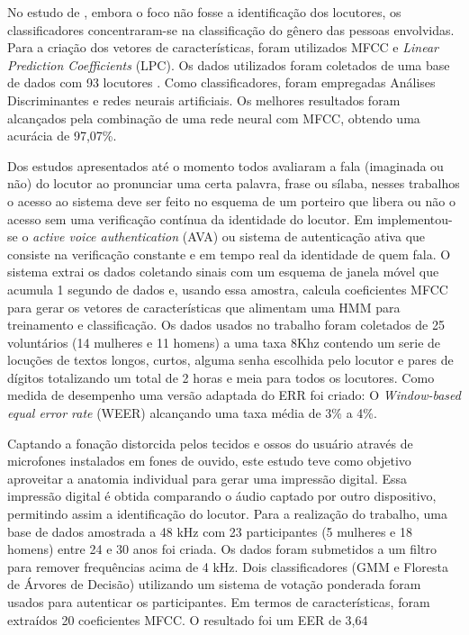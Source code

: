 			\par No estudo de \cite{ali2022speech}, embora o foco não fosse a identificação dos locutores, os classificadores concentraram-se na classificação do gênero das pessoas envolvidas. Para a criação dos vetores de características, foram utilizados MFCC e \textit{Linear Prediction Coefficients} (LPC). Os dados utilizados foram coletados de uma base de dados com 93 locutores \cite{10.1121/1.411872}. Como classificadores, foram empregadas Análises Discriminantes e redes neurais artificiais. Os melhores resultados foram alcançados pela combinação de uma rede neural com MFCC, obtendo uma acurácia de 97,07\%.
			

			\par Dos estudos apresentados até o momento todos avaliaram a fala (imaginada ou não) do locutor ao pronunciar uma certa palavra, frase ou sílaba, nesses trabalhos o acesso ao sistema deve ser feito no esquema de um porteiro que libera ou não o acesso sem uma verificação contínua da identidade do locutor. Em \cite{WOS:000525844000004} implementou-se o \textit{active voice authentication} (AVA) ou sistema de autenticação ativa que consiste na verificação constante e em tempo real da identidade de quem fala. O sistema extrai os dados coletando sinais com um esquema de janela móvel que acumula 1 segundo de dados e, usando essa amostra, calcula coeficientes MFCC para gerar os vetores de características que alimentam uma HMM para treinamento e classificação. Os dados usados no trabalho foram coletados de 25 voluntários (14 mulheres e 11 homens) a uma taxa 8Khz contendo um serie de locuções de textos longos, curtos, alguma senha escolhida pelo locutor e pares de dígitos totalizando um total de 2 horas e meia para todos os locutores. Como medida de desempenho uma versão adaptada do ERR foi criado: O \textit{Window-based equal error rate} (WEER) alcançando uma taxa média de 3\% a 4\%.
			
			\par Captando a fonação distorcida pelos tecidos e ossos do usuário através de microfones instalados em fones de ouvido, este estudo \cite{10.1145/3448113} teve como objetivo aproveitar a anatomia individual para gerar uma impressão digital. Essa impressão digital é obtida comparando o áudio captado por outro dispositivo, permitindo assim a identificação do locutor. Para a realização do trabalho, uma base de dados amostrada a 48 kHz com 23 participantes (5 mulheres e 18 homens) entre 24 e 30 anos foi criada. Os dados foram submetidos a um filtro para remover frequências acima de 4 kHz. Dois classificadores (GMM e Floresta de Árvores de Decisão) utilizando um sistema de votação ponderada foram usados para autenticar os participantes. Em termos de características, foram extraídos 20 coeficientes MFCC. O resultado foi um EER de 3,64%
			
